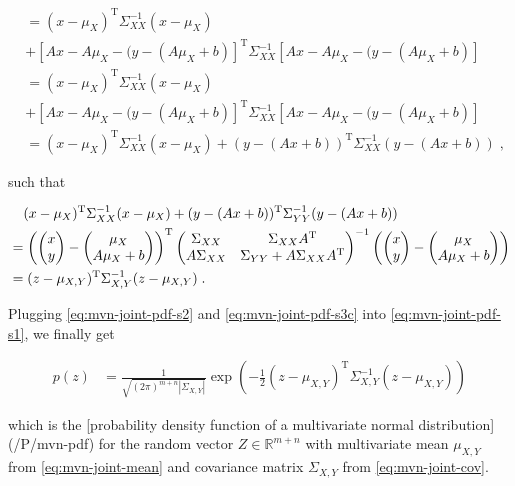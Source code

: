 \documentclass[a4paper,12pt]{article}
\begin{document}
\begin{equation}
\begin{split}
&= (x - \mu_X)^\mathrm{T} \Sigma_{XX}^{-1} (x - \mu_X) \\
&+ \left[ Ax - A\mu_X - (y - (A\mu_X + b) \right]^\mathrm{T} \Sigma_{XX}^{-1} \left[  Ax - A\mu_X - (y - (A\mu_X + b) \right] \\
&= (x - \mu_X)^\mathrm{T} \Sigma_{XX}^{-1} (x - \mu_X) \\
&+ \left[ Ax - A\mu_X - (y - (A\mu_X + b) \right]^\mathrm{T} \Sigma_{XX}^{-1} \left[  Ax - A\mu_X - (y - (A\mu_X + b) \right] \\
&= (x - \mu_X)^\mathrm{T} \Sigma_{XX}^{-1} (x - \mu_X) + (y - (Ax + b))^\mathrm{T} \Sigma_{XX}^{-1} (y - (Ax + b)) \; ,
\end{split}
\end{equation}

such that

\begin{equation} \label{eq:mvn-joint-pdf-s3c}
\begin{split}
&\hphantom{=}\; (x-\mu_X)^\mathrm{T} \Sigma_{XX}^{-1} (x-\mu_X) + (y-(Ax+b))^\mathrm{T} \Sigma_{YY}^{-1} (y-(Ax+b)) \\
&= \left( \begin{pmatrix} x \\ y \end{pmatrix} - \begin{pmatrix} \mu_X \\ A\mu_X + b \end{pmatrix} \right)^\mathrm{T}
\begin{pmatrix}
\Sigma_{XX}   & \Sigma_{XX} A^\mathrm{T} \\
A \Sigma_{XX} & \Sigma_{YY} + A \Sigma_{XX} A^\mathrm{T}
\end{pmatrix}^{-1}
\left( \begin{pmatrix} x \\ y \end{pmatrix} - \begin{pmatrix} \mu_X \\ A\mu_X + b \end{pmatrix} \right) \\
&= (z-\mu_{X,Y})^\mathrm{T} \Sigma_{X,Y}^{-1} (z-\mu_{X,Y}) \; .
\end{split}
\end{equation}

Plugging \eqref{eq:mvn-joint-pdf-s2} and \eqref{eq:mvn-joint-pdf-s3c} into \eqref{eq:mvn-joint-pdf-s1}, we finally get

\begin{equation} \label{eq:mvn-joint-pdf-s4}
\begin{split}
   p(z)
&= \frac{1}{\sqrt{(2\pi)^{m+n} |\Sigma_{X,Y}|}} \exp\left(-\frac{1}{2} (z-\mu_{X,Y})^\mathrm{T} \Sigma_{X,Y}^{-1} (z-\mu_{X,Y}) \right)
\end{split}
\end{equation}

which is the [probability density function of a multivariate normal distribution](/P/mvn-pdf) for the random vector $Z \in \mathbb{R}^{m+n}$ with multivariate mean $\mu_{X,Y}$ from \eqref{eq:mvn-joint-mean} and covariance matrix $\Sigma_{X,Y}$ from \eqref{eq:mvn-joint-cov}.
\end{document}
